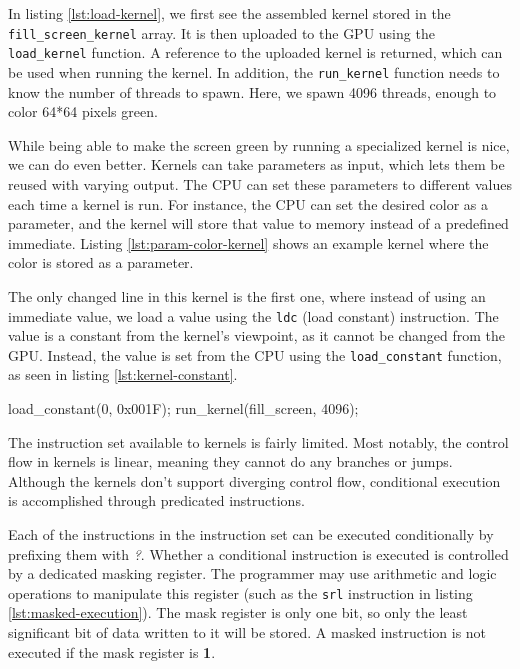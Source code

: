 \documentclass[../main/report.tex]{subfiles}
\begin{document}
In listing \ref{lst:load-kernel}, we first see the assembled kernel stored in the
\verb/fill_screen_kernel/ array.
It is then uploaded to the GPU using the \verb/load_kernel/ function.
A reference to the uploaded kernel is returned, which can be used when running the kernel.
In addition, the \verb/run_kernel/ function needs to know the number of threads to spawn.
Here, we spawn 4096 threads, enough to color 64*64 pixels green.

While being able to make the screen green by running a specialized kernel is nice,
we can do even better.
Kernels can take parameters as input, which lets them be reused with varying output.
The CPU can set these parameters to different values each time a kernel is run.
For instance, the CPU can set the desired color as a parameter,
and the kernel will store that value to memory instead of a predefined immediate.
Listing \ref{lst:param-color-kernel} shows an example kernel where the color is stored as a parameter.


The only changed line in this kernel is the first one,
where instead of using an immediate value, we load a value using the \verb/ldc/ (load constant) instruction.
The value is a constant from the kernel's viewpoint, as it cannot be changed from the GPU.
Instead, the value is set from the CPU using the \verb/load_constant/ function,
as seen in listing \ref{lst:kernel-constant}.

\begin{c-code}[caption=Now drawing a blue screen using parameters, label=lst:kernel-constant]
load_constant(0, 0x001F);
run_kernel(fill_screen, 4096);
\end{c-code}

The instruction set available to kernels is fairly limited.
Most notably, the control flow in kernels is linear, meaning they cannot do any branches or jumps.
Although the kernels don't support diverging control flow,
conditional execution is accomplished through predicated instructions.

Each of the instructions in the instruction set can be executed conditionally by prefixing them with \emph{?}.
Whether a conditional instruction is executed is controlled by a dedicated masking register.
The programmer may use arithmetic and logic operations to manipulate this register (such as the \verb/srl/ instruction in listing \ref{lst:masked-execution}).
The mask register is only one bit, so only the least significant bit of data written to it will be stored.
A masked instruction is not executed if the mask register is \textbf{1}.
\end{document}
